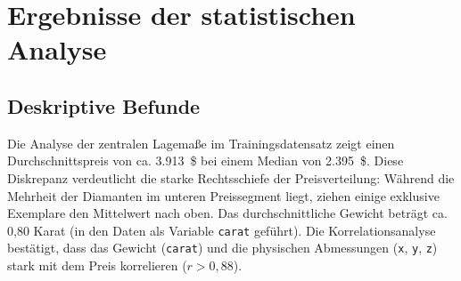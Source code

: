 \section{Ergebnisse der statistischen Analyse}
\subsection{Deskriptive Befunde}
Die Analyse der zentralen Lagemaße im Trainingsdatensatz zeigt einen Durchschnittspreis von ca. 3.913~\$ bei einem Median von 2.395~\$. Diese Diskrepanz verdeutlicht die starke Rechtsschiefe der Preisverteilung: Während die Mehrheit der Diamanten im unteren Preissegment liegt, ziehen einige exklusive Exemplare den Mittelwert nach oben. Das durchschnittliche Gewicht beträgt ca. 0,80 Karat (in den Daten als Variable \texttt{carat} geführt). Die Korrelationsanalyse bestätigt, dass das Gewicht (\texttt{carat}) und die physischen Abmessungen (\texttt{x}, \texttt{y}, \texttt{z}) stark mit dem Preis korrelieren ($r > 0,88$).




%